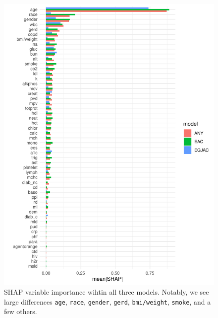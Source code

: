 \documentclass[12pt]{article}
\begin{document}
\begin{figure}[h]
\centering
\includegraphics[width=1.0\textwidth]{figures/eac_v_egjac/shap_groups_cancertype.pdf}
\caption{SHAP variable importance wihtin all three models. Notably, we see large differences
\texttt{age}, \texttt{race}, \texttt{gender}, \texttt{gerd}, \texttt{bmi/weight}, \texttt{smoke}, and a few others.}
\end{figure}


\end{document}
